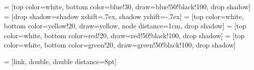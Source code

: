 \documentclass[a4paper,12pt,landscape,UTF8]{ctexart}
\begin{document}
\thispagestyle{empty}

\usetikzlibrary{positioning}
\usetikzlibrary{shadows}
\usetikzlibrary{calc}

 = [top color=white, bottom color=blue!30, draw=blue!50!black!100, drop shadow]
 = [drop shadow={shadow xshift=.7ex, shadow yshift=-.7ex}]
 = [top color=white, bottom color=yellow!20, draw=yellow, node distance=1cm, drop shadow]
 = [top color=white, bottom color=red!20, draw=red!50!black!100, drop shadow]
 = [top color=white, bottom color=green!20, draw=green!50!black!100, drop shadow]

\makeatletter
{}
\makeatother

 = [link, double, double distance=8pt]
\end{document}
